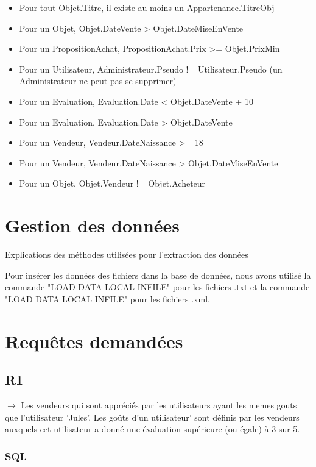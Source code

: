 \documentclass[a4paper,11pt]{article}
\begin{document}
\begin{itemize}
    \item Pour tout Objet.Titre, il existe au moins un Appartenance.TitreObj
    \item Pour un Objet, Objet.DateVente > Objet.DateMiseEnVente
    \item Pour un PropositionAchat, PropositionAchat.Prix >= Objet.PrixMin
    \item Pour un Utilisateur, Administrateur.Pseudo != Utilisateur.Pseudo (un Administrateur ne peut pas se supprimer)
    \item Pour un Evaluation, Evaluation.Date < Objet.DateVente + 10
    \item Pour un Evaluation, Evaluation.Date > Objet.DateVente
    \item Pour un Vendeur, Vendeur.DateNaissance >= 18
    \item Pour un Vendeur, Vendeur.DateNaissance > Objet.DateMiseEnVente
    \item Pour un Objet, Objet.Vendeur != Objet.Acheteur
\end{itemize}

\section{Gestion des données}

Explications des méthodes utilisées pour l'extraction des données

Pour insérer les données des fichiers dans la base de données, nous avons utilisé la commande "LOAD DATA LOCAL INFILE" pour les fichiers .txt et la commande "LOAD DATA LOCAL INFILE" pour les fichiers .xml. 

\section{Requêtes demandées}

\subsection{R1}

$\rightarrow$ Les vendeurs qui sont appréciés par les utilisateurs ayant les memes
gouts que l'utilisateur 'Jules'. Les goûts d'un utilisateur' sont définis par les vendeurs auxquels cet utilisateur a donné une évaluation supérieure (ou égale) à 3 sur 5.

\subsubsection{SQL}
\end{document}
